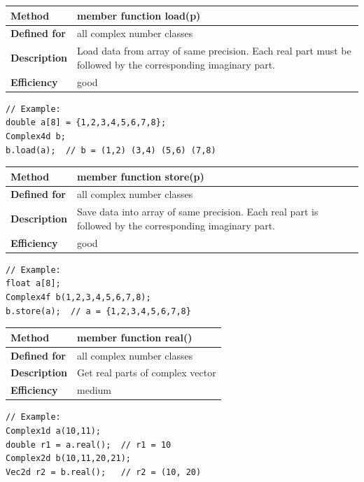 \documentclass[11pt,a4paper,oneside,openright]{report}
\newcommand{\vspacesmall}{\vspace{3mm}}
\newcommand{\vspacebig}{\vspace{6mm}}
\begin{document}
\begin{tabular}{|p{25mm}|p{100mm}|}
\hline
\bfseries Method & member function load(p) \\ \hline
\bfseries Defined for & all complex number classes \\ \hline
\bfseries Description & Load data from array of same precision. 
Each real part must be followed by the corresponding imaginary part. \\ \hline
\bfseries Efficiency & good \\ \hline
\end{tabular}
\vspacesmall

\begin{lstlisting}[frame=none]
// Example:
double a[8] = {1,2,3,4,5,6,7,8};
Complex4d b;
b.load(a);  // b = (1,2) (3,4) (5,6) (7,8)
\end{lstlisting}
\vspacebig


\begin{tabular}{|p{25mm}|p{100mm}|}
\hline
\bfseries Method & member function store(p) \\ \hline
\bfseries Defined for & all complex number classes \\ \hline
\bfseries Description & Save data into array of same precision. 
Each real part is followed by the corresponding imaginary part. \\ \hline
\bfseries Efficiency & good \\ \hline
\end{tabular}
\vspacesmall

\begin{lstlisting}[frame=none]
// Example:
float a[8];
Complex4f b(1,2,3,4,5,6,7,8);
b.store(a);  // a = {1,2,3,4,5,6,7,8}
\end{lstlisting}
\vspacebig


\begin{tabular}{|p{25mm}|p{100mm}|}
\hline
\bfseries Method & member function real() \\ \hline
\bfseries Defined for & all complex number classes \\ \hline
\bfseries Description & Get real parts of complex vector \\ \hline
\bfseries Efficiency & medium \\ \hline
\end{tabular}
\vspacesmall

\begin{lstlisting}[frame=none]
// Example:
Complex1d a(10,11);
double r1 = a.real();  // r1 = 10
Complex2d b(10,11,20,21);
Vec2d r2 = b.real();   // r2 = (10, 20)

\end{lstlisting}
\vspacebig
\end{document}
